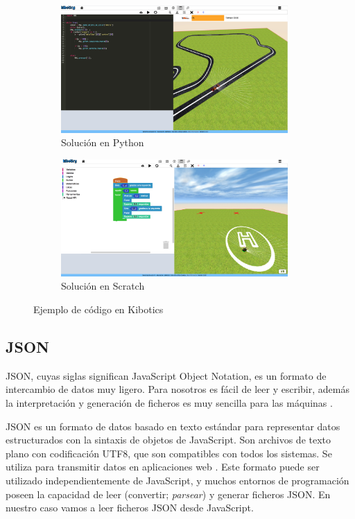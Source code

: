 \begin{figure}[H]
  \begin{subfigure}[b]{1\textwidth}
  \centering
    \includegraphics[width=0.95\textwidth, height=0.4\textwidth]{chapters/images/python.png}
    \caption{Solución en Python}
    \label{fig:f1}
  \end{subfigure}
  \hfill
  \begin{subfigure}[b]{1\textwidth}
  \centering
    \includegraphics[width=0.95\textwidth, height=0.4\textwidth]{chapters/images/scratch2.png}
    \caption{Solución en Scratch}
    \label{fig:f2}
  \end{subfigure}
  \caption{Ejemplo de código en Kibotics }
\end{figure}


\subsection{JSON} JSON, cuyas siglas significan JavaScript Object Notation, es un formato de intercambio de datos muy ligero. Para nosotros es fácil de leer y escribir, además la interpretación y generación de ficheros es muy sencilla para las máquinas \cite{json}.

JSON es un formato de datos basado en texto estándar para representar datos estructurados con la sintaxis de objetos de JavaScript. Son archivos de texto plano con codificación UTF8, que son compatibles con todos los sistemas. Se utiliza para transmitir datos en aplicaciones web \cite{json2}. 
Este formato puede ser utilizado independientemente de JavaScript, y muchos entornos de programación poseen la capacidad de leer (convertir; \textit{parsear}) y generar ficheros JSON. En nuestro caso vamos a leer ficheros JSON desde JavaScript.

